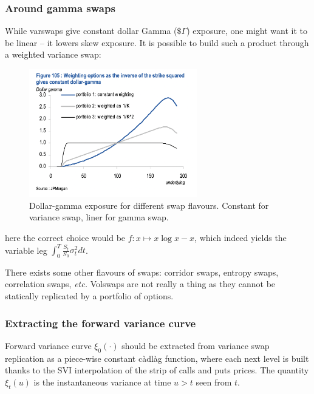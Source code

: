 \subsubsection*{Around gamma swaps}

While varswaps give constant dollar Gamma ($\$\Gamma$) exposure, one might want it to be linear -- it lowers skew exposure. It is possible to build such a product through a weighted variance swap:

\begin{figure}[H]
    \includegraphics[width=0.65\textwidth]{include/img/jpm_varswap_gamma.png}
    \centering
    \caption{Dollar-gamma exposure for different swap flavours. Constant for variance swap, liner for gamma swap.}
    \label{fig:bivariate_contour}
\end{figure}

here the correct choice would be $f: x \mapsto x\log x - x$, which indeed yields the variable leg $\int_{0}^{T} \frac{S_t}{S_0} \sigma_t^2 dt$.

There exists some other flavours of swaps: corridor swaps, entropy swaps, correlation swaps, \textit{etc.} Volswaps are not really a thing as they cannot be statically replicated by a portfolio of options.

\subsubsection*{Extracting the forward variance curve}

Forward variance curve $\xi_0(\cdot)$ should be extracted from variance swap replication as a piece-wise constant c\`adl\`ag function, where each next level is built thanks to the SVI interpolation of the strip of calls and puts prices. The quantity $\xi_t(u)$ is the instantaneous variance at time $u > t$ seen from $t$.